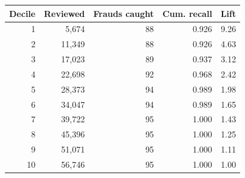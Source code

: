 \begin{tabular}{r r r r r}
\hline
\textbf{Decile} & \textbf{Reviewed} & \textbf{Frauds caught} & \textbf{Cum. recall} & \textbf{Lift} \\
\hline
1 & 5{,}674 & 88 & 0.926 & 9.26 \\
2 & 11{,}349 & 88 & 0.926 & 4.63 \\
3 & 17{,}023 & 89 & 0.937 & 3.12 \\
4 & 22{,}698 & 92 & 0.968 & 2.42 \\
5 & 28{,}373 & 94 & 0.989 & 1.98 \\
6 & 34{,}047 & 94 & 0.989 & 1.65 \\
7 & 39{,}722 & 95 & 1.000 & 1.43 \\
8 & 45{,}396 & 95 & 1.000 & 1.25 \\
9 & 51{,}071 & 95 & 1.000 & 1.11 \\
10 & 56{,}746 & 95 & 1.000 & 1.00 \\
\hline
\end{tabular}